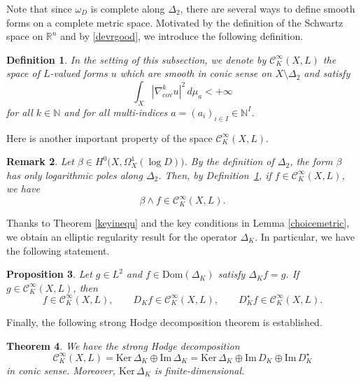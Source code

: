\documentclass[english]{amsart}
\newcommand{\cC}{\mathcal{C}}
\newcommand{\im}{\mathrm{Im} \,}
\renewcommand{\ker}{\mathrm{Ker} \,}
\newtheorem{thm}{Theorem}[section]
\newtheorem{proposition}[thm]{Proposition}
\newtheorem{defn}[thm]{Definition}
\newtheorem{remark}[thm]{Remark}
\numberwithin{equation}{thm}
\begin{document}
\medskip

Note that since $\omega_D$ is complete along $\Delta_2$, there are several ways to define smooth forms on a complete metric space.
Motivated by the definition of the Schwartz space on $\mathbb R^n$ and by \eqref{devrgood}, we introduce the following definition.

\begin{defn}\label{smoothK}\cite[Definition 8.9]{CDHP}
		In the setting of this subsection, we denote by $\cC^\infty_K(X, L)$ the space of $L$-valued forms $u$ which are smooth in conic sense on $X \setminus \Delta_2$ and satisfy
	\[
	\int_X |\nabla^k_{\mathrm{cov}} u|^2 \, d\mu_a < +\infty
	\]
	for all $k \in \mathbb N$ and for all multi-indices $a = (a_i)_{i \in I} \in \mathbb N^I$.
\end{defn}

Here is another important property of the space $\cC^\infty_K(X, L)$.
\begin{remark}\label{realsmooth}
	Let $\beta \in H^0\bigl(X, \Omega_X^1(\log D)\bigr)$. By the definition of $\Delta_2$, the form $\beta$ has only logarithmic poles along $\Delta_2$. Then, by Definition~\ref{smoothK}, if $f \in \mathcal{C}^\infty_K(X, L)$, we have
	\[
	\beta \wedge f \in \mathcal{C}^\infty_K(X, L).
	\]
	
\end{remark}

Thanks to Theorem \ref{keyinequ} and the key conditions in Lemma \ref{choicemetric}, we obtain an elliptic regularity result for the operator $\Delta_K$.
In particular, we have the following statement.

\begin{proposition}
	Let $g \in L^2$ and $f \in \mathrm{Dom}(\Delta_K)$ satisfy $\Delta_K f = g$.
	If $g \in \cC^\infty_K(X, L)$, then
	\[
	f \in \cC^\infty_K(X, L), \qquad
	D_K f \in \cC^\infty_K(X, L), \qquad
	D_K^\star f \in \cC^\infty_K(X, L).
	\]
\end{proposition}
\medskip

Finally, the following strong Hodge decomposition theorem is established.

\begin{thm}\label{smoothhodge}\cite[Thm 8.20]{CDHP}
We have the strong Hodge decomposition
	\[
	\cC^\infty_K(X, L)
	= \ker \Delta_K \oplus \im \Delta_K
	= \ker \Delta_K \oplus \im D_K \oplus \im D_K^\star
	\]
	in conic sense.
	Moreover, $\ker \Delta_K$ is finite-dimensional.
\end{thm}
\end{document}
